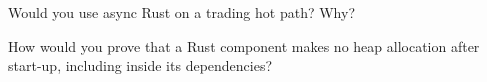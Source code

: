 \begin{interviewq}\label{iq:ll:rust-for-low-latency:5}
Would you use async Rust on a trading hot path? Why?
\end{interviewq}

\begin{interviewq}\label{iq:ll:rust-for-low-latency:6}
How would you prove that a Rust component makes no heap allocation after start-up, including inside its dependencies?
\end{interviewq}
